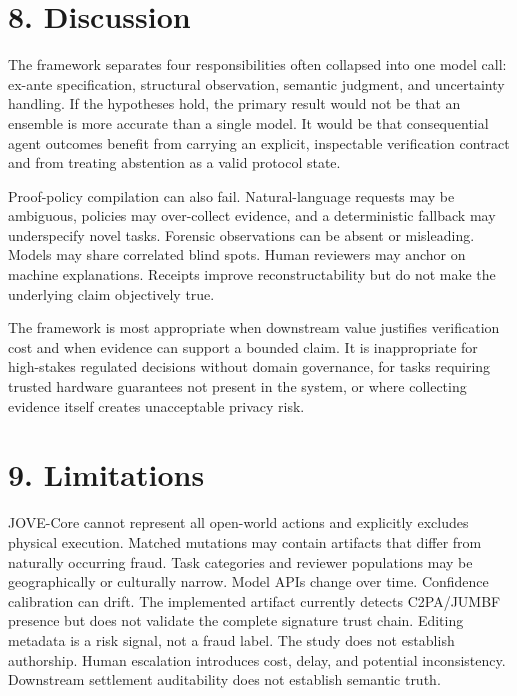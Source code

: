 \documentclass[11pt]{article}
\begin{document}
\section{8. Discussion}

The framework separates four responsibilities often collapsed into one model call: ex-ante specification, structural observation, semantic judgment, and uncertainty handling. If the hypotheses hold, the primary result would not be that an ensemble is more accurate than a single model. It would be that consequential agent outcomes benefit from carrying an explicit, inspectable verification contract and from treating abstention as a valid protocol state.\par

Proof-policy compilation can also fail. Natural-language requests may be ambiguous, policies may over-collect evidence, and a deterministic fallback may underspecify novel tasks. Forensic observations can be absent or misleading. Models may share correlated blind spots. Human reviewers may anchor on machine explanations. Receipts improve reconstructability but do not make the underlying claim objectively true.\par

The framework is most appropriate when downstream value justifies verification cost and when evidence can support a bounded claim. It is inappropriate for high-stakes regulated decisions without domain governance, for tasks requiring trusted hardware guarantees not present in the system, or where collecting evidence itself creates unacceptable privacy risk.\par

\section{9. Limitations}

JOVE-Core cannot represent all open-world actions and explicitly excludes physical execution. Matched mutations may contain artifacts that differ from naturally occurring fraud. Task categories and reviewer populations may be geographically or culturally narrow. Model APIs change over time. Confidence calibration can drift. The implemented artifact currently detects C2PA/JUMBF presence but does not validate the complete signature trust chain. Editing metadata is a risk signal, not a fraud label. The study does not establish authorship. Human escalation introduces cost, delay, and potential inconsistency. Downstream settlement auditability does not establish semantic truth.\par
\end{document}
